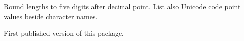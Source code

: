 \documentclass[paper=B5,DIV=calc,parskip=half]{scrartcl}
\begin{document}
\begin{description}[style=nextline, labelwidth=4.5em, leftmargin=!,
  labelindent=0em]
  \item[\texttt{v0.02}] Round lengths to five digits after decimal
    point. List also Unicode code point values beside character names.
  \item[\texttt{v0.01}] First published version of this package.
\end{description}
\end{document}
